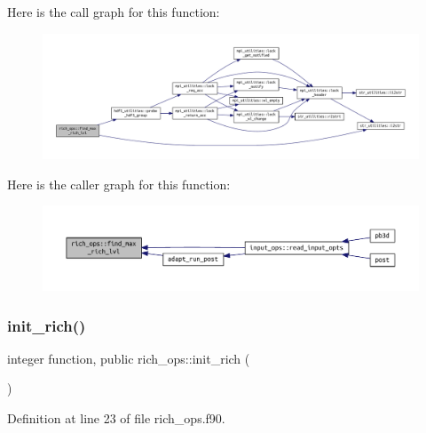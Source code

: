 Here is the call graph for this function\+:
\nopagebreak
\begin{figure}[H]
\begin{center}
\leavevmode
\includegraphics[width=350pt]{namespacerich__ops_acadb2170408937a71a230e655bd15675_cgraph}
\end{center}
\end{figure}
Here is the caller graph for this function\+:
\nopagebreak
\begin{figure}[H]
\begin{center}
\leavevmode
\includegraphics[width=350pt]{namespacerich__ops_acadb2170408937a71a230e655bd15675_icgraph}
\end{center}
\end{figure}
\mbox{\label{namespacerich__ops_a9fbbda93eab8973d33063e277c489e7b}} 
\subsubsection{\texorpdfstring{init\+\_\+rich()}{init\_rich()}}
{\footnotesize\ttfamily integer function, public rich\+\_\+ops\+::init\+\_\+rich (\begin{DoxyParamCaption}{ }\end{DoxyParamCaption})}



Definition at line 23 of file rich\+\_\+ops.\+f90.

